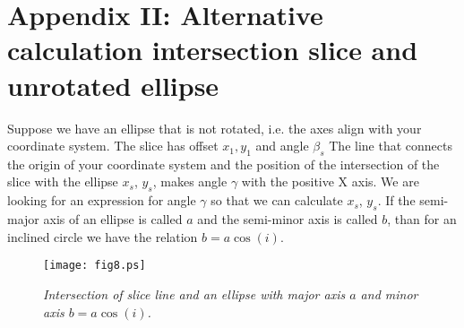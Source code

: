 \documentclass[11pt,a4paper]{article}
\newcommand{\cosb}[1]{\cos \left( #1 \right)}
\begin{document}
\section*{Appendix II: Alternative calculation intersection slice and unrotated ellipse}
Suppose we have an ellipse that is not rotated, i.e. the axes align with your
coordinate system.  The slice has offset
\begin{math} x_{1}, y_{1}  \end{math} and angle \begin{math} \beta_{s} \end{math}
The line that connects the origin of your coordinate system and the position
of the intersection of the slice with the ellipse $x_s$, $y_s$, 
makes angle $\gamma$ with the positive X axis.
We are looking for an expression for angle \begin{math} \gamma \end{math} so that we 
can calculate $x_s$, $y_s$.
If the semi-major axis of an ellipse is called $a$ and the semi-minor axis is 
called $b$,
than for an inclined circle we have the relation $b=a \cos (i)$.

\begin{figure}[h]
   \centering
   \texttt{[image: fig8.ps]}
   \caption{\it Intersection of slice line and an ellipse with major axis $a$ and
                minor axis $b = a\cosb{i}$.}
   \label{fig:fig8}
\end{figure}
\end{document}

